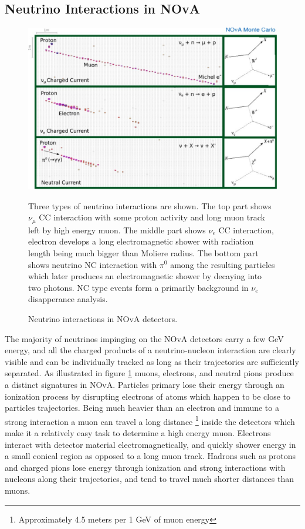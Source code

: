 \subsection{Neutrino Interactions in NOvA}
\begin{figure}
\includegraphics[width=1.0\textwidth]{figures/Det_topologies.pdf}\\%
\caption{Neutrino interactions in NOvA detectors.}
{Three types of neutrino interactions are shown. The top part shows $\nu_\mu$ CC interaction with some
proton activity and long muon track left by high energy muon. The middle part shows $\nu_e$ CC interaction,
electron develops a long electromagnetic shower with radiation length being much bigger than Moliere radius.
The bottom part shows neutrino NC interaction with $\pi^0$ among the resulting particles which later produces
an electromagnetic shower by decaying into two photons. NC type events form a primarily background in $\nu_e$
disapperance analysis.} \label{fig:Topologies}
\end{figure}
The majority of neutrinos impinging on the NOvA detectors carry a few GeV energy, and all the charged
products of a neutrino-nucleon interaction are clearly visible and can be individually tracked as long as their 
trajectories are sufficiently separated. As illustrated in figure \ref{fig:Topologies} muons, electrons, 
and neutral pions produce a distinct signatures in NOvA. Particles primary lose their energy through an 
ionization 
process by disrupting electrons of atoms which happen to be close to particles trajectories. Being 
much heavier than an electron and immune to a strong interaction a muon can travel a long distance
\footnote{Approximately 4.5 meters per 1 GeV of muon energy} inside the detectors which make it a relatively 
easy task to determine a high energy muon. Electrons interact with detector material electromagnetically, and 
quickly shower energy in a small conical region as opposed to a long muon track. Hadrons such as protons and 
charged pions lose energy through ionization and strong interactions with nucleons along their trajectories, and tend 
to travel much shorter distances than muons.

